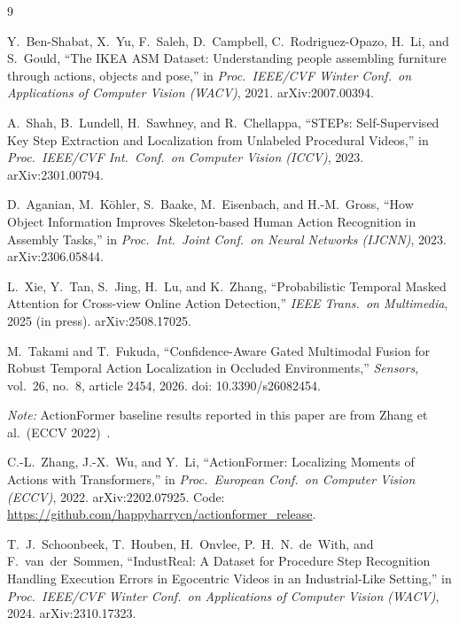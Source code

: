 \documentclass[11pt,a4paper]{article}
\begin{document}
\begin{thebibliography}{9}

Y.~Ben-Shabat, X.~Yu, F.~Saleh, D.~Campbell, C.~Rodriguez-Opazo, H.~Li, and S.~Gould,
``The IKEA ASM Dataset: Understanding people assembling furniture through actions, objects and pose,''
in \emph{Proc.\ IEEE/CVF Winter Conf.\ on Applications of Computer Vision (WACV)}, 2021.
arXiv:2007.00394.

A.~Shah, B.~Lundell, H.~Sawhney, and R.~Chellappa,
``STEPs: Self-Supervised Key Step Extraction and Localization from Unlabeled Procedural Videos,''
in \emph{Proc.\ IEEE/CVF Int.\ Conf.\ on Computer Vision (ICCV)}, 2023.
arXiv:2301.00794.

D.~Aganian, M.~K\"ohler, S.~Baake, M.~Eisenbach, and H.-M.~Gross,
``How Object Information Improves Skeleton-based Human Action Recognition in Assembly Tasks,''
in \emph{Proc.\ Int.\ Joint Conf.\ on Neural Networks (IJCNN)}, 2023.
arXiv:2306.05844.

L.~Xie, Y.~Tan, S.~Jing, H.~Lu, and K.~Zhang,
``Probabilistic Temporal Masked Attention for Cross-view Online Action Detection,''
\emph{IEEE Trans.\ on Multimedia}, 2025 (in press).
arXiv:2508.17025.

M.~Takami and T.~Fukuda,
``Confidence-Aware Gated Multimodal Fusion for Robust Temporal Action Localization in Occluded Environments,''
\textit{Sensors}, vol.~26, no.~8, article 2454, 2026.
doi: 10.3390/s26082454.

\textit{Note:} ActionFormer baseline results reported in this paper are from Zhang et al.~(ECCV 2022)~\cite{zhang2022actionformer}.

C.-L.~Zhang, J.-X.~Wu, and Y.~Li,
``ActionFormer: Localizing Moments of Actions with Transformers,''
in \emph{Proc.\ European Conf.\ on Computer Vision (ECCV)}, 2022.
arXiv:2202.07925.
Code: \url{https://github.com/happyharrycn/actionformer\_release}.

T.~J.~Schoonbeek, T.~Houben, H.~Onvlee, P.~H.~N.~de~With, and F.~van~der~Sommen,
``IndustReal: A Dataset for Procedure Step Recognition Handling Execution Errors
in Egocentric Videos in an Industrial-Like Setting,''
in \emph{Proc.\ IEEE/CVF Winter Conf.\ on Applications of Computer Vision (WACV)}, 2024.
arXiv:2310.17323.


\end{thebibliography}
\end{document}
